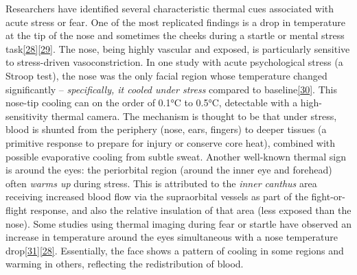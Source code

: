 \documentclass[12pt,a4paper]{article}
\begin{document}
Researchers have identified several characteristic thermal cues associated with acute stress or fear. One of the most replicated findings is a drop in temperature at the tip of the nose and sometimes the cheeks during a startle or mental stress task\href{https://pubmed.ncbi.nlm.nih.gov/37514696/\#:~:text=both\%20conditions\%2C\%20which\%20was\%20not,signals\%20significantly\%20varies\%20with\%20gender}{{[}28{]}}\href{https://pmc.ncbi.nlm.nih.gov/articles/PMC10385045/\#:~:text=both\%20conditions\%2C\%20which\%20was\%20not,signals\%20significantly\%20varies\%20with\%20gender}{{[}29{]}}. The nose, being highly vascular and exposed, is particularly sensitive to stress-driven vasoconstriction. In one study with acute psychological stress (a Stroop test), the nose was the only facial region whose temperature changed significantly -- \emph{specifically, it cooled under stress} compared to baseline\href{https://pmc.ncbi.nlm.nih.gov/articles/PMC10385045/\#:~:text=Among\%20the\%20facial\%20regions\%2C\%20the,as\%20shown\%20in\%20Figure\%204}{{[}30{]}}. This nose-tip cooling can on the order of 0.1°C to 0.5°C, detectable with a high-sensitivity thermal camera. The mechanism is thought to be that under stress, blood is shunted from the periphery (nose, ears, fingers) to deeper tissues (a primitive response to prepare for injury or conserve core heat), combined with possible evaporative cooling from subtle sweat. Another well-known thermal sign is around the eyes: the periorbital region (around the inner eye and forehead) often \emph{warms up} during stress. This is attributed to the \emph{inner canthus} area receiving increased blood flow via the supraorbital vessels as part of the fight-or-flight response, and also the relative insulation of that area (less exposed than the nose). Some studies using thermal imaging during fear or startle have observed an increase in temperature around the eyes simultaneous with a nose temperature drop\href{https://www.rti.org/rti-press-publication/using-thermal-imaging-measure-mental-effort-nose-know\#:~:text=Using\%20thermal\%20imaging\%20to\%20measure,Temperature\%20change}{{[}31{]}}\href{https://pubmed.ncbi.nlm.nih.gov/37514696/\#:~:text=both\%20conditions\%2C\%20which\%20was\%20not,signals\%20significantly\%20varies\%20with\%20gender}{{[}28{]}}. Essentially, the face shows a pattern of cooling in some regions and warming in others, reflecting the redistribution of blood.
\end{document}
